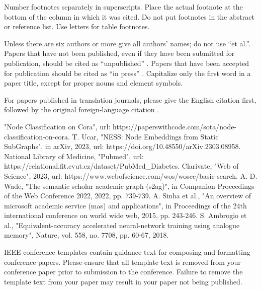 \documentclass[conference]{IEEEtran}
\begin{document}
Number footnotes separately in superscripts. Place the actual footnote at 
the bottom of the column in which it was cited. Do not put footnotes in the 
abstract or reference list. Use letters for table footnotes.

Unless there are six authors or more give all authors' names; do not use 
``et al.''. Papers that have not been published, even if they have been 
submitted for publication, should be cited as ``unpublished'' \cite{b4}. Papers 
that have been accepted for publication should be cited as ``in press'' \cite{b5}. 
Capitalize only the first word in a paper title, except for proper nouns and 
element symbols.

For papers published in translation journals, please give the English 
citation first, followed by the original foreign-language citation \cite{b6}.

\begin{thebibliography}{00}
 "Node Classification on Cora", url: https://paperswithcode.com/sota/node-classification-on-cora.
 T. Ucar, "NESS: Node Embeddings from Static SubGraphs", in arXiv, 2023, url: https://doi.org/10.48550/arXiv.2303.08958. 
 National Library of Medicine, "Pubmed", url: https://relational.fit.cvut.cz/dataset/PubMed\_Diabetes.
 Clarivate, "Web of Science", 2023, url: https://www.webofscience.com/wos/woscc/basic-search.
 A. D. Wade, "The semantic scholar academic graph (s2ag)", in Companion Proceedings of the Web Conference 2022, 2022, pp. 739-739.
 A. Sinha et al., "An overview of microsoft academic service (mas) and applications", in Proceedings of the 24th international conference on world wide web, 2015, pp. 243-246.
 S. Ambrogio et al., "Equivalent-accuracy accelerated neural-network training using analogue memory", Nature, vol. 558, no. 7708, pp. 60-67, 2018.
\end{thebibliography}
\vspace{12pt}
\color{red}
IEEE conference templates contain guidance text for composing and formatting conference papers. Please ensure that all template text is removed from your conference paper prior to submission to the conference. Failure to remove the template text from your paper may result in your paper not being published.
\end{document}
